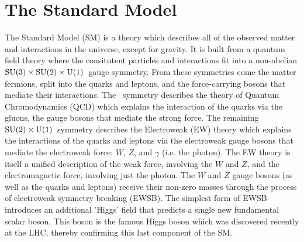 






\section{The Standard Model}

The Standard Model (SM) is a theory which describes all of the
observed matter and interactions in the universe, except for gravity.
It is built from a quantum field theory where the consitutent particles
and interactions fit into a non-abelian 
$\textrm{SU(3)}\times\textrm{SU(2)}\times\textrm{U(1)}$~gauge symmetry.
From these symmetries come the matter fermions, split 
into the quarks and leptons, and the force-carrying bosons
that mediate their interactions.
The \suthree~symmetry describes the theory of Quantum Chromodynamics (QCD)
which explains the interaction of the quarks via the gluons, the
gauge bosons that mediate the strong force.
The remaining $\textrm{SU(2)}\times\textrm{U(1)}$~symmetry 
describes the Electroweak (EW) theory which explains
the interactions of the quarks and leptons via the 
electroweak gauge bosons that mediate
the electroweak force: $W$, $Z$, and $\gamma$ (i.e. the photon).
The EW theory is itself a unified description of the weak force,
involving the $W$ and $Z$, and the electromagnetic force, involving
just the photon.
The $W$ and $Z$ gauge bosons (as well as the quarks and leptons) receive
their non-zero masses through the process of electroweak symmetry
breaking (EWSB). The simplest form of EWSB
introduces an additional 'Higgs' field that
predicts a single new fundamental scalar boson. This boson is the
famous Higgs boson which was discovered recently at the LHC, thereby
confirming this last component of the SM.


